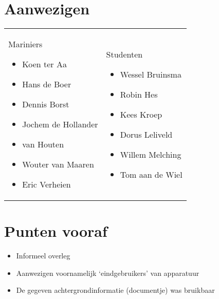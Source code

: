 \documentclass[12pt, a4paper]{article}
\date{\displaydate{date}}
\begin{document}
\section{Aanwezigen}
\begin{tabular}{p{}p{}}
    Mariniers
    \begin{itemize}
        \item Koen ter Aa
        \item Hans de Boer
        \item Dennis Borst
        \item Jochem de Hollander
        \item van Houten
        \item Wouter van Maaren
        \item Eric Verheien
    \end{itemize} &

    Studenten
    \begin{itemize}
        \item Wessel Bruinsma
        \item Robin Hes
        \item Kees Kroep
        \item Dorus Leliveld
        \item Willem Melching
        \item Tom aan de Wiel
    \end{itemize} \\
\end{tabular}


\section{Punten vooraf}
\begin{itemize}
  \item Informeel overleg
  \item Aanwezigen voornamelijk `eindgebruikers' van apparatuur
  \item De gegeven achtergrondinformatie (documentje) was bruikbaar
\end{itemize}
\end{document}
